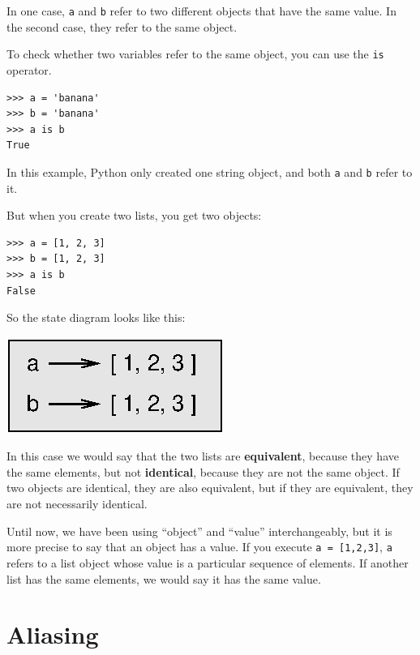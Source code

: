 \documentclass[10pt]{book}
\begin{document}
In one case, {\tt a} and {\tt b} refer to two different objects that
have the same value.  In the second case, they refer to the same
object.


To check whether two variables refer to the same object, you can
use the {\tt is} operator.

\beforeverb
\begin{verbatim}
>>> a = 'banana'
>>> b = 'banana'
>>> a is b
True
\end{verbatim}
\afterverb
%
In this example, Python only created one string object,
and both {\tt a} and {\tt b} refer to it.

But when you create two lists, you get two objects:

\beforeverb
\begin{verbatim}
>>> a = [1, 2, 3]
>>> b = [1, 2, 3]
>>> a is b
False
\end{verbatim}
\afterverb
%
So the state diagram looks like this:


\beforefig
\centerline{\includegraphics{figs/list2.eps}}
\afterfig

In this case we would say that the two lists are {\bf equivalent},
because they have the same elements, but not {\bf identical}, because
they are not the same object.  If two objects are identical, they are
also equivalent, but if they are equivalent, they are not necessarily
identical.


Until now, we have been using ``object'' and ``value''
interchangeably, but it is more precise to say that an object has a
value.  If you execute {\tt a = [1,2,3]}, {\tt a} refers to a list
object whose value is a particular sequence of elements.  If another
list has the same elements, we would say it has the same value.



\section{Aliasing}
\end{document}
